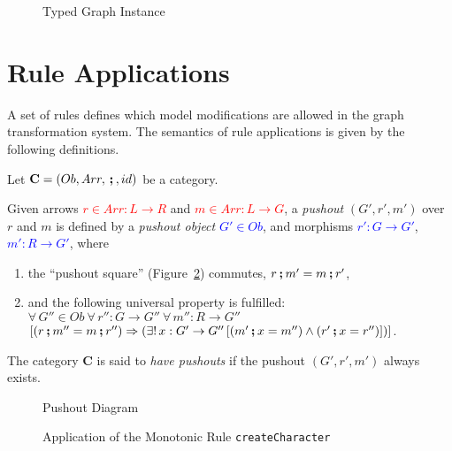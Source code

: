 \begin{figure}[h!]
	\centering
	
	\caption{Typed Graph Instance}
	\label{fig:example-typed-graph-instance}
\end{figure}

\section{Rule Applications}
\label{fundamentals-rule-applications}
A set of rules defines which model modifications are allowed in the graph transformation system.
The semantics of rule applications is given by the following definitions.

\begin{definition}[Pushouts]
	\label{def:pushouts}%
	Let $\mathbf{C} = (Ob, Arr, \textbf{\,;\,}, id)$ be a category.

	\gap
	Given arrows \textcolor{red}{$r \in Arr: L \rightarrow R$} and \textcolor{red}{$m \in Arr: L \rightarrow G$}, a \emph{pushout} $(G', r', m')$ over $r$ and $m$ is defined by
	a \emph{pushout object} \textcolor{blue}{$G' \in Ob$}, and
	morphisms \textcolor{blue}{$r': G \rightarrow G'$}, \textcolor{blue}{$m': R \rightarrow G'$},
	where
	\begin{enumerate}
		\item the ``pushout square'' (Figure~\ref{fig:pushout}) commutes, \ie $r \textbf{\,;\,} m' = m \textbf{\,;\,} r'$,
		\item and the following universal property is fulfilled:\\
		$\forall\, G'' \in Ob~ \forall\, r'': G \rightarrow G''~ \forall\, m'': R \rightarrow G''$\\
		$[(r \textbf{\,;\,} m'' = m \textbf{\,;\,} r'') \Rightarrow (\exists!\, x: G' \rightarrow G''\, [(m' \textbf{\,;\,} x = m'') \wedge (r' \textbf{\,;\,} x = r'')])]$.
	\end{enumerate}
	The category $\mathbf{C}$ is said to \emph{have pushouts} if the pushout $(G', r', m')$ always exists. 
\end{definition}

\begin{figure}[h!]
	\centering
	
	\caption{Pushout Diagram}
	\label{fig:pushout}
\end{figure}

\begin{figure}[h!]
	\centering
	
	\caption{Application of the Monotonic Rule \texttt{createCharacter}}
	\label{fig:example-monotonic-rule-application}
\end{figure}

